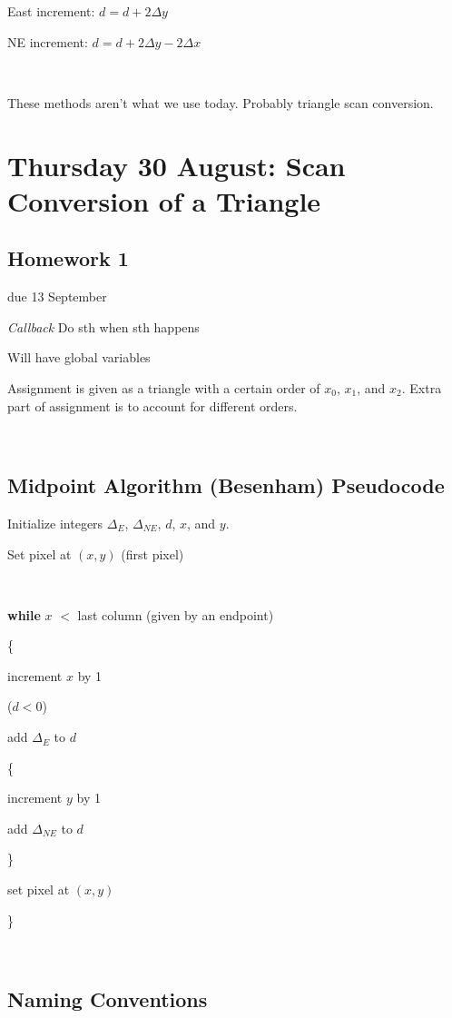 \documentclass[12pt]{article}
\begin{document}
\begin{spacing}{1.2}
East increment:  $d = d + 2 \Delta y$

NE increment:  $d = d + 2 \Delta y - 2 \Delta x$

\

These methods aren't what we use today.  Probably triangle scan conversion.  

\section{Thursday 30 August:  Scan Conversion of a Triangle}

\subsection{Homework 1} due 13 September

{\it Callback}  Do sth when sth happens

Will have global variables

Assignment is given as a triangle with a certain order of $x_0$, $x_1$, and $x_2$.  Extra part of assignment is to account for different orders.  

\

\subsection{Midpoint Algorithm (Besenham) Pseudocode}

Initialize integers $\Delta_E$, $\Delta_{NE}$, $d$, $x$, and $y$.  

Set pixel at $(x,y)$ (first pixel)

\

{\bf while} $x$ $<$ last column (given by an endpoint)

\{

	\qquad increment $x$ by 1
	
	 ($d<0$)
	
		\qquad \qquad add $\Delta _E$ to $d$
	
	
	\qquad \{
	
		\qquad \qquad increment $y$ by 1
		
		\qquad \qquad add $\Delta_{NE}$ to $d$
	
	\qquad \}
	
	\qquad set pixel at $(x,y)$

\}

\

\subsection{Naming Conventions}


\end{spacing}
\end{document}
